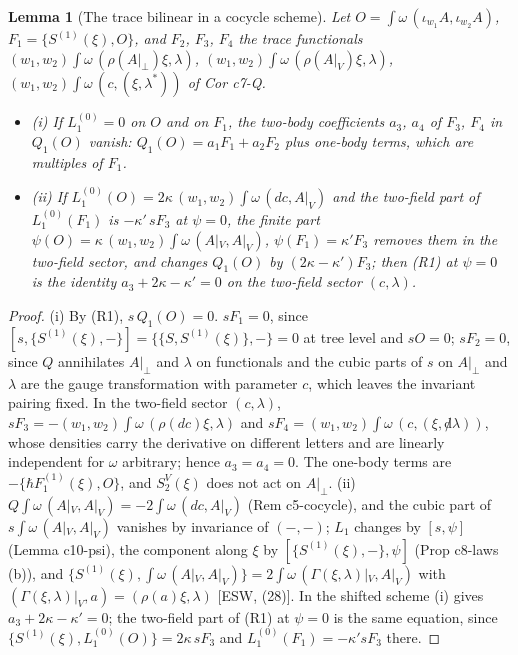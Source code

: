 \documentclass[11pt]{article}
\numberwithin{equation}{section}
\theoremstyle{plain}
\newtheorem{lemma}[theorem]{Lemma}
\theoremstyle{definition}
\newcommand{\Ap}{A|_{\perp}}
\newcommand{\AV}{A|_V}
\begin{document}
\begin{lemma}[The trace bilinear in a cocycle scheme]
\label{lem:qs-cocycle}
Let $O=\int\omega\,(\iota_{w_1}A,\iota_{w_2}A)$, $F_1=\{S^{(1)}(\xi),O\}$, and $F_2$, $F_3$, $F_4$ the trace functionals $(w_1,w_2)\int\omega\,(\rho(\Ap)\xi,\lambda)$, $(w_1,w_2)\int\omega\,(\rho(\AV)\xi,\lambda)$, $(w_1,w_2)\int\omega\,(c,(\xi,\lambda^*))$ of Cor c7-Q.
\begin{itemize}
\item (i) If $L_1^{(0)}=0$ on $O$ and on $F_1$, the two-body coefficients $a_3$, $a_4$ of $F_3$, $F_4$ in $Q_1(O)$ vanish: $Q_1(O)=a_1F_1+a_2F_2$ plus one-body terms, which are multiples of $F_1$.
\item (ii) If $L_1^{(0)}(O)=2\kappa\,(w_1,w_2)\int\omega\,(dc,\AV)$ and the two-field part of $L_1^{(0)}(F_1)$ is $-\kappa'\,sF_3$ at $\psi=0$, the finite part $\psi(O)=\kappa\,(w_1,w_2)\int\omega\,(\AV,\AV)$, $\psi(F_1)=\kappa'F_3$ removes them in the two-field sector, and changes $Q_1(O)$ by $(2\kappa-\kappa')F_3$; then (R1) at $\psi=0$ is the identity $a_3+2\kappa-\kappa'=0$ on the two-field sector $(c,\lambda)$.
\end{itemize}
\end{lemma}

\begin{proof}
(i) By (R1), $s\,Q_1(O)=0$. $sF_1=0$, since $[s,\{S^{(1)}(\xi),-\}]=\{\{S,S^{(1)}(\xi)\},-\}=0$ at tree level and $sO=0$; $sF_2=0$, since $Q$ annihilates $\Ap$ and $\lambda$ on functionals and the cubic parts of $s$ on $\Ap$ and $\lambda$ are the gauge transformation with parameter $c$, which leaves the invariant pairing fixed. In the two-field sector $(c,\lambda)$, $sF_3=-(w_1,w_2)\int\omega\,(\rho(dc)\xi,\lambda)$ and $sF_4=(w_1,w_2)\int\omega\,(c,(\xi,{\not d}\lambda))$, whose densities carry the derivative on different letters and are linearly independent for $\omega$ arbitrary; hence $a_3=a_4=0$. The one-body terms are $-\{\hbar F_1^{(1)}(\xi),O\}$, and $S^V_2(\xi)$ does not act on $\Ap$. (ii) $Q\int\omega\,(\AV,\AV)=-2\int\omega\,(dc,\AV)$ (Rem c5-cocycle), and the cubic part of $s\int\omega\,(\AV,\AV)$ vanishes by invariance of $(-,-)$; $L_1$ changes by $[s,\psi]$ (Lemma c10-psi), the component along $\xi$ by $[\{S^{(1)}(\xi),-\},\psi]$ (Prop c8-laws (b)), and $\{S^{(1)}(\xi),\int\omega\,(\AV,\AV)\}=2\int\omega\,(\Gamma(\xi,\lambda)|_V,\AV)$ with $(\Gamma(\xi,\lambda)|_V,a)=(\rho(a)\xi,\lambda)$ [ESW, (28)]. In the shifted scheme (i) gives $a_3+2\kappa-\kappa'=0$; the two-field part of (R1) at $\psi=0$ is the same equation, since $\{S^{(1)}(\xi),L_1^{(0)}(O)\}=2\kappa\,sF_3$ and $L_1^{(0)}(F_1)=-\kappa'sF_3$ there.
\end{proof}
\end{document}
